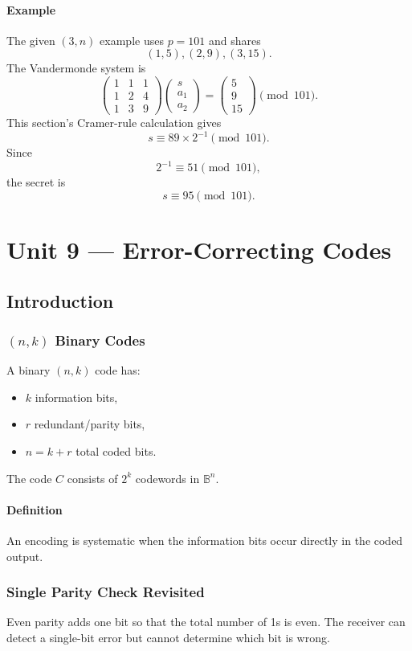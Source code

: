 \documentclass[12pt]{article}
\newcommand{\Definition}{\paragraph{Definition}}
\newcommand{\Example}{\paragraph{Example}}
\begin{document}
\Example The given $(3,n)$ example uses $p=101$ and shares
\[
(1,5),(2,9),(3,15).
\]
The Vandermonde system is
\[
\begin{pmatrix}
1&1&1\\
1&2&4\\
1&3&9
\end{pmatrix}
\begin{pmatrix}
s\\a_1\\a_2
\end{pmatrix}
=
\begin{pmatrix}5\\9\\15\end{pmatrix}
\pmod{101}.
\]
This section's Cramer-rule calculation gives
\[
s\equiv89\times2^{-1}\pmod{101}.
\]
Since
\[
2^{-1}\equiv51\pmod{101},
\]
the secret is
\[
s\equiv95\pmod{101}.
\]

\newpage
\section{Unit 9 --- Error-Correcting Codes}

\subsection{Introduction}
\subsubsection{$(n,k)$ Binary Codes}
A binary $(n,k)$ code has:
\begin{itemize}
    \item $k$ information bits,
    \item $r$ redundant/parity bits,
    \item $n=k+r$ total coded bits.
\end{itemize}
The code $C$ consists of $2^k$ codewords in $\mathbb B^n$.

\Definition An encoding is systematic when the information bits occur directly in the coded output.

\subsubsection{Single Parity Check Revisited}
Even parity adds one bit so that the total number of 1s is even. The receiver can detect a single-bit error but cannot determine which bit is wrong.
\end{document}

